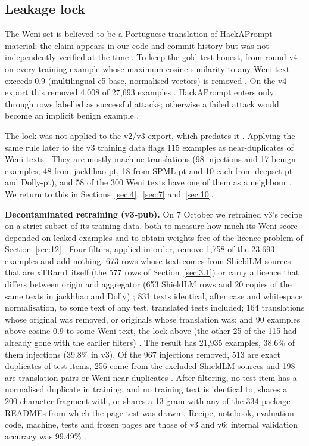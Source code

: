 \documentclass[11pt]{article}
\begin{document}
\subsection{Leakage lock}\label{sec:3.4}

The Weni set is believed to be a Portuguese translation of HackAPrompt material; the claim appears in our code and commit history but was not independently verified at the time%
. To keep the gold test honest, from round v4 on every training example whose maximum cosine similarity to any Weni text exceeds 0.9 (multilingual-e5-base, normalised vectors) is removed%
. On the v4 export this removed 4,008 of 27,693 examples%
. HackAPrompt enters only through rows labelled as successful attacks; otherwise a failed attack would become an implicit benign example%
.

The lock was not applied to the v2/v3 export, which predates it%
. Applying the same rule later to the v3 training data flags 115 examples as near-duplicates of Weni texts%
. They are mostly machine translations (98 injections and 17 benign examples; 48 from jackhhao-pt, 18 from SPML-pt and 10 each from deepset-pt and Dolly-pt), and 58 of the 300 Weni texts have one of them as a neighbour%
. We return to this in Sections~\ref{sec:4},~\ref{sec:7} and~\ref{sec:10}.

\textbf{Decontaminated retraining (v3-pub).} On 7 October we retrained v3's recipe on a strict subset of its training data, both to measure how much its Weni score depended on leaked examples and to obtain weights free of the licence problem of Section~\ref{sec:12}%
. Four filters, applied in order, remove 1,758 of the 23,693 examples and add nothing: 673 rows whose text comes from ShieldLM sources that are xTRam1 itself (the 577 rows of Section~\ref{sec:3.1}) or carry a licence that differs between origin and aggregator (653 ShieldLM rows and 20 copies of the same texts in jackhhao and Dolly)%
; 831 texts identical, after case and whitespace normalisation, to some text of any test, translated tests included; 164 translations whose original was removed, or originals whose translation was; and 90 examples above cosine 0.9 to some Weni text, the lock above (the other 25 of the 115 had already gone with the earlier filters)%
. The result has 21,935 examples, 38.6\% of them injections (39.8\% in v3). Of the 967 injections removed, 513 are exact duplicates of test items, 256 come from the excluded ShieldLM sources and 198 are translation pairs or Weni near-duplicates%
. After filtering, no test item has a normalised duplicate in training, and no training text is identical to, shares a 200-character fragment with, or shares a 13-gram with any of the 334 package READMEs from which the page test was drawn%
. Recipe, notebook, evaluation code, machine, tests and frozen pages are those of v3 and v6; internal validation accuracy was 99.49\%%
.
\end{document}
